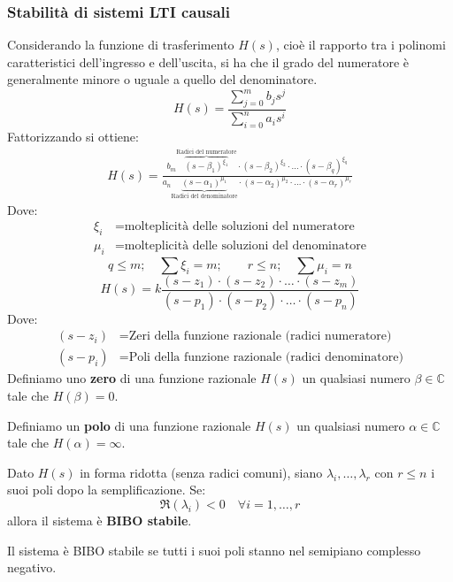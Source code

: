 \documentclass[a4paper]{article}
\begin{document}
\subsubsection{Stabilità di sistemi LTI causali}
Considerando la funzione di trasferimento \( H(s) \), cioè il rapporto tra i polinomi
caratteristici dell'ingresso e dell'uscita, si ha che
il grado del numeratore è generalmente minore o uguale a quello del denominatore.
\[
  H(s) = \frac{\sum_{j=0}^{m} b_j s^{j}}{\sum_{i=0}^{n} a_i s^{i}}
\] 
Fattorizzando si ottiene:
\[
  \begin{aligned}
    H(s) = \frac{b_m \overbrace{\left( s - \beta_1 \right)^{\xi_1}}^{\text{Radici del numeratore}} \cdot \left( s - \beta_2 \right)^{\xi_2} \cdot \ldots \cdot \left( s - \beta_q \right)^{\xi_q}}
    {a_n \underbrace{\left( s - \alpha_1 \right)^{ \mu_1 }}_{\text{Radici del denominatore}} \cdot \left( s - \alpha_2 \right)^{ \mu_2 } \cdot \ldots \cdot \left( s - \alpha_r \right)^{ \mu_r }}
  \end{aligned}
\] 
Dove:
\[
  \begin{aligned}
    \xi_i &= \text{molteplicità delle soluzioni del numeratore}\\
    \mu_i &= \text{molteplicità delle soluzioni del denominatore}
  \end{aligned}
\] 
\[
  q \le m; \quad \sum \xi_i = m; \qquad r \le n; \quad \sum \mu_i = n
\] 
\[
  H(s) = k \frac{\left( s - z_1\right) \cdot \left( s - z_2 \right) \cdot \ldots \cdot \left( s - z_m \right)}
  {\left( s - p_1 \right) \cdot \left( s - p_2 \right) \cdot \ldots \cdot \left( s - p_n \right)}
\] 
Dove:
\[
  \begin{aligned}
    (s-z_i) &= \text{Zeri della funzione razionale (radici numeratore)}\\
    (s-p_i) &= \text{Poli della funzione razionale (radici denominatore)}
  \end{aligned}
\]
Definiamo uno \textbf{zero} di una funzione razionale \( H(s) \) un qualsiasi
numero \( \beta \in \mathbb{C} \) tale che \( H(\beta) = 0\).

Definiamo un \textbf{polo} di una funzione razionale \( H(s) \) un qualsiasi
numero \( \alpha \in \mathbb{C} \) tale che \( H(\alpha) = \infty \).

\vspace{1em}
\noindent
\begin{definition}
  Dato \( H(s) \) in forma ridotta (senza radici comuni), siano \( \lambda_i, \ldots,
  \lambda_r\) con \( r \le n \) i suoi poli dopo la semplificazione. Se:
  \[
    \Re(\lambda_i) < 0 \quad \forall i = 1, \ldots, r
  \] 
  allora il sistema è \textbf{BIBO stabile}.

  \vspace{1em}
  \noindent
  Il sistema è BIBO stabile se tutti i suoi poli stanno nel semipiano complesso negativo.
\end{definition}
\end{document}
